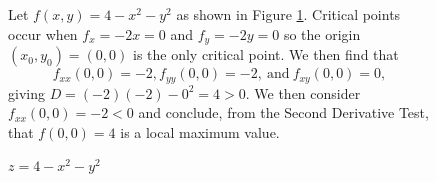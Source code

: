 \begin{figure}[ht]
  \begin{minipage}{3.75in}
    \begin{example} Let $f(x,y) = 4-x^2-y^2$ as
      shown in Figure \ref{F:10.7.max}.  Critical points occur when $f_x
      = -2x = 0$ and $f_y=-2y = 0$ so the origin $(x_0, y_0)= (0,0)$ is
      the only critical point.  We then find that
      $$
      f_{xx}(0,0) = -2, f_{yy}(0,0) = -2,\ \mbox{and} \ f_{xy}(0,0) = 0,
      $$
      giving $D = (-2)(-2) - 0^2 = 4 > 0$.  We then consider
      $f_{xx}(0,0) = -2 < 0$ and conclude, from the Second Derivative
      Test, that $f(0,0)=4$ is a local maximum value.
    \end{example}
  \end{minipage}
  \hspace*{0.25in}
  \begin{minipage}[h]{2.5in}
    \begin{center}
      \caption{$z=4-x^2-y^2$}
      \label{F:10.7.max}
    \end{center}
  \end{minipage}


\end{figure}
